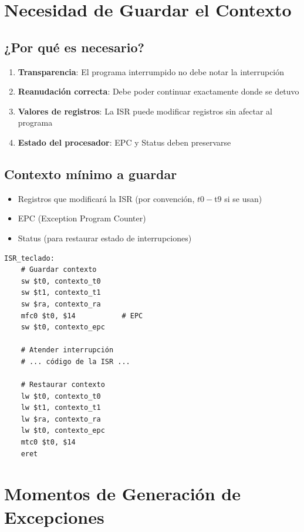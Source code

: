 \documentclass[12pt,a4paper]{article}
\begin{document}
\section{Necesidad de Guardar el Contexto}

\subsection{¿Por qué es necesario?}
\begin{enumerate}
    \item \textbf{Transparencia}: El programa interrumpido no debe notar la interrupción
    \item \textbf{Reanudación correcta}: Debe poder continuar exactamente donde se detuvo
    \item \textbf{Valores de registros}: La ISR puede modificar registros sin afectar al programa
    \item \textbf{Estado del procesador}: EPC y Status deben preservarse
\end{enumerate}

\subsection{Contexto mínimo a guardar}
\begin{itemize}
    \item Registros que modificará la ISR (por convención, $t0-$t9 si se usan)
    \item EPC (Exception Program Counter)
    \item Status (para restaurar estado de interrupciones)
\end{itemize}

\begin{lstlisting}[style=mipsstyle, caption={Guardado de contexto típico}]
ISR_teclado:
    # Guardar contexto
    sw $t0, contexto_t0
    sw $t1, contexto_t1
    sw $ra, contexto_ra
    mfc0 $t0, $14           # EPC
    sw $t0, contexto_epc
    
    # Atender interrupción
    # ... código de la ISR ...
    
    # Restaurar contexto
    lw $t0, contexto_t0
    lw $t1, contexto_t1
    lw $ra, contexto_ra
    lw $t0, contexto_epc
    mtc0 $t0, $14
    eret
\end{lstlisting}

\section{Momentos de Generación de Excepciones}
\end{document}
